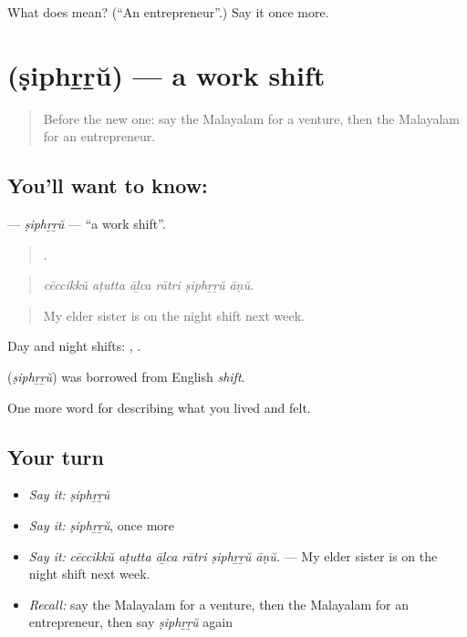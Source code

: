 \begin{tcolorbox}[breakable,colback=teal!4,colframe=teal!35!black,title={Before you move on}]
What does  mean? (\textquotedblleft{}An entrepreneur\textquotedblright{}.) Say it once more.
\end{tcolorbox}
\section[\texorpdfstring{\ml{ഷിഫ്റ്റ്} (ṣiphṟṟŭ)}{ഷിഫ്റ്റ് (ṣiphṟṟŭ)}]{ (ṣiphṟṟŭ) — a work shift}

\label{lesson:ML-C544-siphrru}



\begin{quote}
Before the new one: say the Malayalam for a venture, then the Malayalam for an entrepreneur.
\end{quote}

\subsection*{You'll want to know: }
\textbf{} — \emph{ṣiphṟṟŭ} — \textquotedblleft{}a work shift\textquotedblright{}.

\begin{quote}
     .
\end{quote}

\begin{quote}
\emph{cēccikkŭ aṭutta āḻca rātri ṣiphṟṟŭ āṇŭ.}
\end{quote}

\begin{quote}
My elder sister is on the night shift next week.
\end{quote}

Day and night shifts:  ,  .

\begin{cousinweb}
\textbf{} (\emph{ṣiphṟṟŭ}) was borrowed from English \emph{shift}.
\end{cousinweb}

\begin{grammarlens}[title={What you've built}]
One more word for describing what you lived and felt.
\end{grammarlens}

\subsection*{Your turn}
\begin{itemize}
\raggedright
  \item \emph{Say it:} \emph{ṣiphṟṟŭ}
  \item \emph{Say it:} \emph{ṣiphṟṟŭ}, once more
  \item \emph{Say it:} \emph{cēccikkŭ aṭutta āḻca rātri ṣiphṟṟŭ āṇŭ.} — My elder sister is on the night shift next week.
  \item \emph{Recall:} say the Malayalam for a venture, then the Malayalam for an entrepreneur, then say \emph{ṣiphṟṟŭ} again
\end{itemize}

